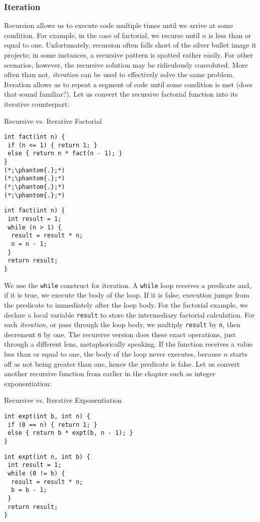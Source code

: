 \subsubsection*{Iteration}
Recursion allows us to execute code multiple times until we arrive at some condition. For example, in the case of factorial, we recurse until $n$ is less than or equal to one. Unfortunately, recursion often falls short of the silver bullet image it projects; in some instances, a recursive pattern is spotted rather easily. For other scenarios, however, the recursive solution may be ridiculously convoluted. More often than not, \textit{iteration} can be used to effectively solve the same problem. Iteration allows us to repeat a segment of code until some condition is met (does that sound familiar?). Let us convert the recursive factorial function into its iterative counterpart:

\begin{clrr}[main.c]{Recursive vs. Iterative Factorial}
\begin{lstlisting}[language=MyC]
int fact(int n) {
 if (n <= 1) { return 1; }
 else { return n * fact(n - 1); }
}
(*;\phantom{.};*)
(*;\phantom{.};*)
(*;\phantom{.};*)
(*;\phantom{.};*)
\end{lstlisting}
\tcblower
\begin{lstlisting}[language=MyNLNC]
int fact(int n) {
 int result = 1;
 while (n > 1) {
  result = result * n;
  n = n - 1;
 }
 return result;
}
\end{lstlisting}
\end{clrr}

We use the \texttt{while} construct for iteration. A \texttt{while} loop receives a predicate and, if it is true, we execute the body of the loop. If it is false, execution jumps from the predicate to immediately after the loop body. For the factorial example, we declare a local variable \texttt{result} to store the intermediary factorial calculation. For each \textit{iteration}, or pass through the loop body, we multiply \texttt{result} by \texttt{n}, then decrement \texttt{n} by one. The recursive version does these exact operations, just through a different lens, metaphorically speaking. If the function receives a value less than or equal to one, the body of the loop never executes, because $n$ starts off as not being greater than one, hence the predicate is false. Let us convert another recursive function from earlier in the chapter such as integer exponentiation:

\begin{clrr}[main.c]{Recursive vs. Iterative Exponentiation}
\begin{lstlisting}[language=MyC]
int expt(int b, int n) {
 if (0 == n) { return 1; }
 else { return b * expt(b, n - 1); }
}
\end{lstlisting}
\tcblower
\begin{lstlisting}[language=MyC]
int expt(int n, int b) {
 int result = 1;
 while (0 != b) {
  result = result * n;
  b = b - 1;
 }
 return result;
}
\end{lstlisting}
\end{clrr}

